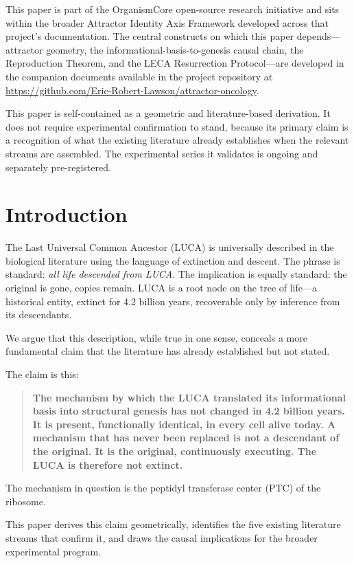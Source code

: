 \documentclass[11pt]{article}
\theoremstyle{definition}
\begin{document}
This paper is part of the OrganismCore open-source research initiative
and sits within the broader Attractor Identity Axis Framework developed
across that project's documentation.
The central constructs on which this paper depends---attractor geometry,
the informational-basis-to-genesis causal chain, the Reproduction Theorem,
and the LECA Resurrection Protocol---are developed in the companion
documents available in the project repository at
\url{https://github.com/Eric-Robert-Lawson/attractor-oncology}.

This paper is self-contained as a geometric and literature-based derivation.
It does not require experimental confirmation to stand, because its primary
claim is a recognition of what the existing literature already establishes
when the relevant streams are assembled.
The experimental series it validates is ongoing and separately pre-registered.

\section{Introduction}

The Last Universal Common Ancestor (LUCA) is universally described in the
biological literature using the language of extinction and descent.
The phrase is standard: \emph{all life descended from LUCA}.
The implication is equally standard: the original is gone, copies remain.
LUCA is a root node on the tree of life---a historical entity, extinct for
4.2 billion years, recoverable only by inference from its descendants.

We argue that this description, while true in one sense, conceals a more
fundamental claim that the literature has already established but not stated.

The claim is this:

\begin{quote}
\textbf{The mechanism by which the LUCA translated its informational basis
into structural genesis has not changed in 4.2 billion years.
It is present, functionally identical, in every cell alive today.
A mechanism that has never been replaced is not a descendant of the original.
It is the original, continuously executing.
The LUCA is therefore not extinct.}
\end{quote}

The mechanism in question is the peptidyl transferase center (PTC) of the
ribosome.

This paper derives this claim geometrically, identifies the five existing
literature streams that confirm it, and draws the causal implications
for the broader experimental program.
\end{document}
